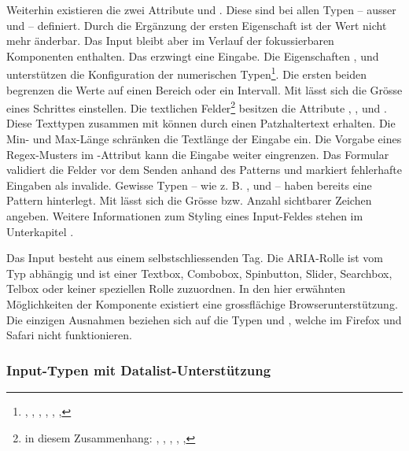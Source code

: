 Weiterhin existieren die zwei Attribute  und . 
Diese sind bei allen Typen – ausser  und  – definiert. 
Durch die Ergänzung der ersten Eigenschaft ist der Wert nicht mehr änderbar. 
Das Input bleibt aber im Verlauf der fokussierbaren Komponenten enthalten. 
Das  erzwingt eine Eingabe. 
Die Eigenschaften ,  und  unterstützen die Konfiguration der numerischen Typen\footnote{
    , , , , , , 
}. 
Die ersten beiden begrenzen die Werte auf einen Bereich oder ein Intervall. 
Mit  lässt sich die Grösse eines Schrittes einstellen. 
Die textlichen Felder\footnote{
    in diesem Zusammenhang: , , , , , 
} besitzen die Attribute , ,  und . 
Diese Texttypen zusammen mit  können durch  einen Patzhaltertext erhalten. 
Die Min- und Max-Länge schränken die Textlänge der Eingabe ein. 
Die Vorgabe eines Regex-Musters im -Attribut kann die Eingabe weiter eingrenzen. 
Das Formular validiert die Felder vor dem Senden anhand des Patterns und markiert fehlerhafte Eingaben als invalide.
Gewisse Typen – wie z. B. ,  und  – haben bereits eine Pattern hinterlegt. 
Mit  lässt sich die Grösse bzw. Anzahl sichtbarer Zeichen angeben. 
Weitere Informationen zum Styling eines Input-Feldes stehen im Unterkapitel \textbf{}. 

Das Input besteht aus einem selbstschliessenden Tag. 
Die ARIA-Rolle ist vom Typ abhängig und ist einer Textbox, Combobox, Spinbutton, Slider, Searchbox, Telbox oder keiner speziellen Rolle zuzuordnen.  
In den hier erwähnten Möglichkeiten der Komponente existiert eine grossflächige Browserunterstützung. 
Die einzigen Ausnahmen beziehen sich auf die Typen  und , welche im Firefox und Safari nicht funktionieren. 


\subsubsection{\color{dblue} {\color{dgray} Input-Typen mit Datalist-Unterstützung}}
\label{sec:inputTypesDatalist}

